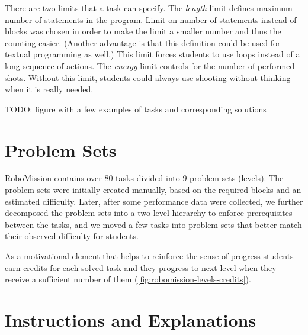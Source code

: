 There are two limits that a task can specify.
The \emph{length} limit defines maximum number of statements
in the program. Limit on number of statements instead of blocks was chosen in
order to make the limit a smaller number and thus the counting easier.
(Another advantage is that this definition could be used for textual
programming as well.)
This limit forces students to use loops instead of a long sequence of
actions.
The \emph{energy} limit controls for the number
of performed shots. Without this limit, students could always use
shooting without thinking when it is really needed.


TODO: figure with a few examples of tasks and corresponding solutions
\clearpage  %


\section{Problem Sets}



RoboMission contains over 80 tasks divided into 9 problem sets (levels).
The problem sets were initially created manually, based on the required blocks
and an estimated difficulty. Later, after some performance data
were collected, we further decomposed the problem sets into a two-level
hierarchy to enforce prerequisites between the tasks, and we moved
a few tasks into problem sets that better match their observed
difficulty for students.


As a motivational element that helps to reinforce the sense of progress
students earn credits for each solved task and they progress to
next level when they receive a sufficient number of them
(\cref{fig:robomission-levels-credits}).



\section{Instructions and Explanations}
\label{sec:game.explanations}


